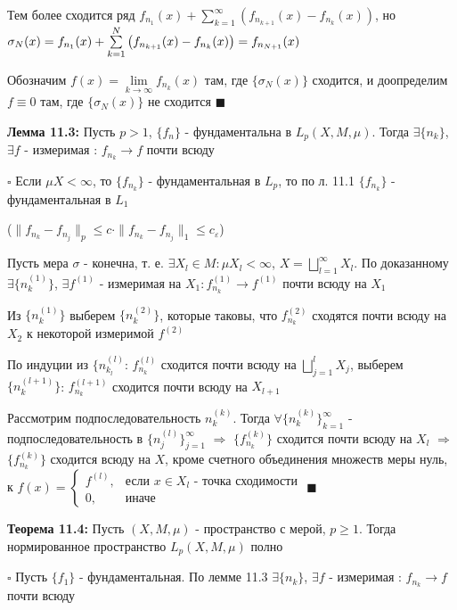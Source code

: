 \documentclass[a4paper]{report}
\newcommand*{\hm}[1]{#1\nobreak\discretionary{}%
            {\hbox{$\mathsurround=0pt #1$}}{}}
\begin{document}
Тем более сходится ряд $f_{n_1}(x)+\sum\limits_{k=1}^\infty\left(f_{n_{k+1}}(x)-f_{n_k}(x)\right)$, но $\sigma_N(x)=f_{n_1}(x)\hm+\sum\limits_{k=1}^N\left(f_{n_{k+1}}(x)-f_{n_k}(x)\right)=f_{n_{N+1}}(x)$

Обозначим $f(x)=\lim\limits_{k\to\infty}f_{n_k}(x)$ там, где $\{\sigma_N(x)\}$ сходится, и доопределим $f\equiv0$ там, где $\{\sigma_N(x)\}$ не сходится
$\blacksquare$
\bigskip

\noindent\textbf{Лемма 11.3:} Пусть $p>1$, $\{f_n\}$ - фундаментальна в $L_p(X,M,\mu)$. Тогда $\exists\{n_k\}$, $\exists f$ - измеримая : $f_{n_k}\to f$ почти всюду

\noindent $\square$ Если $\mu X<\infty$, то $\{f_{n_k}\}$ - фундаментальная в $L_p$, то по л. 11.1 $\{f_{n_k}\}$ - фундаментальная в $L_1$

($\|f_{n_k}-f_{n_j}\|_p\le c\cdot\|f_{n_k}-f_{n_j}\|_1\le c_\varepsilon$)

Пусть мера $\sigma$ - конечна, т. е. $\exists X_l\in M\colon\mu X_l<\infty$, $X=\bigsqcup\limits_{l=1}^\infty X_l$. По доказанному $\exists\{n_k^{(1)}\}$, $\exists f^{(1)}$  - измеримая на $X_1\colon f_{n_k}^{(1)}\to f^{(1)}$ почти всюду на $X_1$

Из $\{n_k^{(1)}\}$ выберем $\{n_k^{(2)}\}$, которые таковы, что $f_{n_k}^{(2)}$ сходятся почти всюду на $X_2$ к некоторой измеримой $f^{(2)}$

По индуции из $\{n_{k_l}^{(l)}$: $f_{n_k}^{(l)}$ сходится почти всюду на $\bigsqcup\limits_{j=1}^l X_j$, выберем $\{n_k^{(l+1)}\}$: $f_{n_k}^{(l+1)}$ сходится почти всюду на $X_{l+1}$

Рассмотрим подпоследовательность $n_k^{(k)}$. Тогда $\forall\{n_k^{(k)}\}_{k=1}^\infty$ - подпоследовательность в $\{n_j^{(l)}\}_{j=1}^\infty$ $\Rightarrow$ $\{f_{n_k}^{(k)}\}$ сходится почти всюду на $X_l$ $\Rightarrow$ $\{f_{n_k}^{(k)}\}$ сходится всюду на $X$, кроме счетного объединения множеств меры нуль, к $f(x)=\begin{cases}f^{(l)},&\text{если }x\in X_l\text{ - точка сходимости}\\0,&\text{иначе}\end{cases}$ $\blacksquare$
\bigskip

\noindent\textbf{Теорема 11.4:} Пусть $(X,M,\mu)$ - пространство с мерой, $p\ge1$. Тогда нормированное пространство $L_p(X,M,\mu)$ полно

\noindent $\square$ Пусть $\{f_1\}$ - фундаментальная. По лемме 11.3 $\exists\{n_k\}$, $\exists f$ - измеримая : $f_{n_k}\to f$ почти всюду
\end{document}
